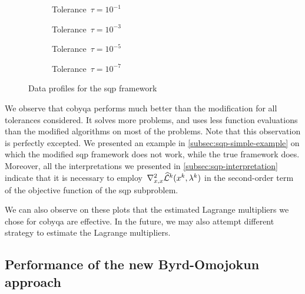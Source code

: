 \begin{figure}[ht]
    \centering
    \begin{subfigure}[b]{0.49\textwidth}
        \centering
        \caption{Tolerance~$\tau = 10^{-1}$}
    \end{subfigure}
    \hfill
    \begin{subfigure}[b]{0.49\textwidth}
        \centering
        \caption{Tolerance~$\tau = 10^{-3}$}
    \end{subfigure}
    \begin{subfigure}[b]{0.49\textwidth}
        \centering
        \caption{Tolerance~$\tau = 10^{-5}$}
    \end{subfigure}
    \hfill
    \begin{subfigure}[b]{0.49\textwidth}
        \centering
        \caption{Tolerance~$\tau = 10^{-7}$}
    \end{subfigure}
    \caption{Data profiles for the \gls{sqp} framework}
    \label{fig:data-wrong-hessian}
\end{figure}

We observe that \gls{cobyqa} performs much better than the modification for all tolerances considered.
It solves more problems, and uses less function evaluations than the modified algorithms on most of the problems.
Note that this observation is perfectly excepted.
We presented an example in \cref{subsec:sqp-simple-example} on which the modified \gls{sqp} framework does not work, while the true framework does.
Moreover, all the interpretations we presented in \cref{subsec:sqp-interpretation} indicate that it is necessary to employ~$\nabla_{x, x}^2 \lagm[k](\iter[k], \lm[k])$ in the second-order term of the objective function of the \gls{sqp} subproblem.

We can also observe on these plots that the estimated Lagrange multipliers we chose for \gls{cobyqa} are effective.
In the future, we may also attempt different strategy to estimate the Lagrange multipliers.

\subsection{Performance of the new Byrd-Omojokun approach}
\label{subsec:perf-byrd-omojokun}

